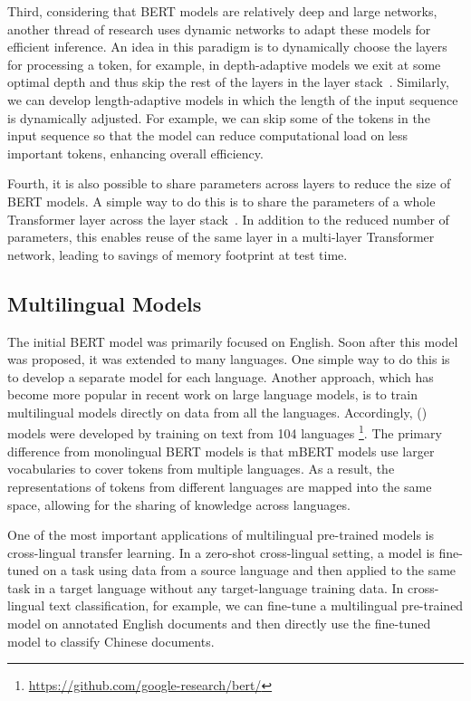 Third, considering that BERT models are relatively deep and large networks, another thread of research uses dynamic networks to adapt these models for efficient inference. An idea in this paradigm is to dynamically choose the layers for processing a token, for example, in depth-adaptive models we exit at some optimal depth and thus skip the rest of the layers in the layer stack~\cite{xin-etal:2020deebert,zhou-etal:2020bert}. Similarly, we can develop length-adaptive models in which the length of the input sequence is dynamically adjusted. For example, we can skip some of the tokens in the input sequence so that the model can reduce computational load on less important tokens, enhancing overall efficiency.

Fourth, it is also possible to share parameters across layers to reduce the size of BERT models. A simple way to do this is to share the parameters of a whole Transformer layer across the layer stack~\cite{dehghani-etal:2018universal,lan-etal:2020albert}. In addition to the reduced number of parameters, this enables reuse of the same layer in a multi-layer Transformer network, leading to savings of memory footprint at test time.

\subsection{Multilingual Models}

\noindent The initial BERT model was primarily focused on English. Soon after this model was proposed, it was extended to many languages. One simple way to do this is to develop a separate model for each language. Another approach, which has become more popular in recent work on large language models, is to train multilingual models directly on data from all the languages. Accordingly,  () models were developed by training on text from 104 languages \footnote{\url{https://github.com/google-research/bert/}}. The primary difference from monolingual BERT models is that mBERT models use larger vocabularies to cover tokens from multiple languages. As a result, the representations of tokens from different languages are mapped into the same space, allowing for the sharing of knowledge across languages.

One of the most important applications of multilingual pre-trained models is cross-lingual transfer learning. In a zero-shot cross-lingual setting, a model is fine-tuned on a task using data from a source language and then applied to the same task in a target language without any target-language training data. In cross-lingual text classification, for example, we can fine-tune a multilingual pre-trained model on annotated English documents and then directly use the fine-tuned model to classify Chinese documents.

